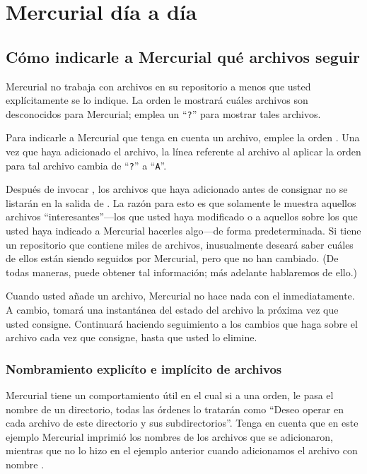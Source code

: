 \chapter{Mercurial día a día}
\label{chap:daily}

\section{Cómo indicarle a Mercurial qué archivos seguir}

Mercurial no trabaja con archivos en su repositorio a menos que usted
explícitamente se lo indique.  La orden  le mostrará
cuáles archivos son desconocidos para Mercurial; emplea un
``\texttt{?}'' para mostrar tales archivos.

Para indicarle a Mercurial que tenga en cuenta un archivo, emplee la
orden . Una vez que haya adicionado el archivo, la línea
referente al archivo al aplicar la orden  para tal
archivo cambia de ``\texttt{?}'' a ``\texttt{A}''.

Después de invocar , los archivos que haya adicionado
antes de consignar no se listarán en la salida de .  La
razón para esto es que  solamente le muestra aquellos
archivos ``interesantes''---los que usted haya modificado o a aquellos
sobre los que usted haya indicado a Mercurial hacerles algo---de forma
predeterminada. Si tiene un repositorio que contiene miles de
archivos, inusualmente deseará saber cuáles de ellos están siendo
seguidos por Mercurial, pero que no han cambiado.  (De todas maneras,
puede obtener tal información; más adelante hablaremos de ello.)


Cuando usted añade un archivo, Mercurial no hace nada con el inmediatamente.
A cambio, tomará una instantánea del estado del archivo la próxima vez
que usted consigne. Continuará haciendo seguimiento a los cambios que
haga sobre el archivo cada vez que consigne, hasta que usted lo elimine.

\subsection{Nombramiento explicíto e implícito de archivos}

Mercurial tiene un comportamiento útil en el cual si a una orden,
le pasa el nombre de un directorio, todas las órdenes lo tratarán como
``Deseo operar en cada archivo de este directorio y sus 
subdirectorios''.
Tenga en cuenta que en este ejemplo Mercurial imprimió los nombres de
los archivos que se adicionaron, mientras que no lo hizo en el ejemplo
anterior cuando adicionamos el archivo con nombre .

